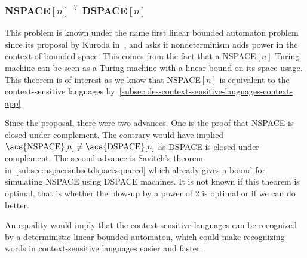 \subsubsection{\acs{NSPACE}$[n]$$\overset{?}{=}$\acs{DSPACE}$[n]$}\label{subsubsec:nspacedspace}

This problem is known under the name first linear bounded automaton problem since its proposal by Kuroda in~\cite{Kuroda1964}, and asks if nondeterminism adds power in the context of bounded space.
This comes from the fact that a \acs{NSPACE}$[n]$ Turing machine can be seen as a Turing machine with a linear bound on its space usage.
This theorem is of interest as we know that \acs{NSPACE}$[n]$ is equivalent to the context-sensitive languages by~\cref{subsec:des-context-sensitive-languages-context-app}.

Since the proposal, there were two advances.
One is the proof that \acs{NSPACE} is closed under complement.
The contrary would have implied $\text{\acs{NSPACE}}[n] \neq \text{\acs{DSPACE}}[n]$ as \acs{DSPACE} is closed under complement.
The second advance is Savitch's theorem in~\cref{subsec:nspacesubsetdspacesquared} which already gives a bound for simulating \acs{NSPACE} using \acs{DSPACE} machines.
It is not known if this theorem is optimal, that is whether the blow-up by a power of 2 is optimal or if we can do better.

An equality would imply that the context-sensitive languages can be recognized by a deterministic linear bounded automaton, which could make recognizing words in context-sensitive languages easier and faster.